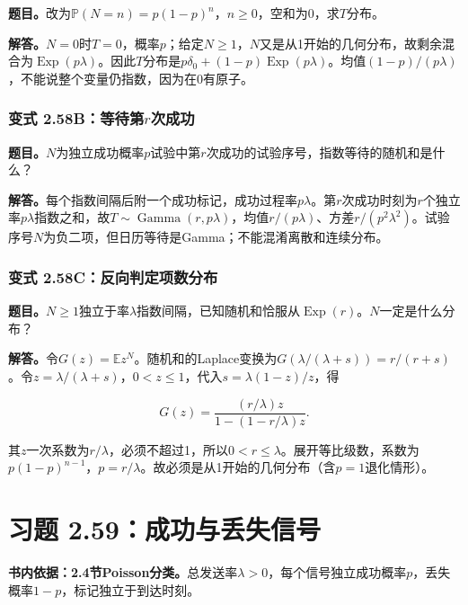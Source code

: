 \documentclass[12pt,a4paper,UTF8,fontset=fandol]{ctexart}
\begin{document}
\textbf{题目。}改为\(\mathbb P(N=n)=p(1-p)^n\)，\(n\ge0\)，空和为0，求\(T\)分布。

\textbf{解答。}\(N=0\)时\(T=0\)，概率\(p\)；给定\(N\ge1\)，\(N\)又是从1开始的几何分布，故剩余混合为\(\operatorname{Exp}(p\lambda)\)。因此\(T\)分布是\(p\delta_0+(1-p)\operatorname{Exp}(p\lambda)\)。均值\((1-p)/(p\lambda)\)，不能说整个变量仍指数，因为在0有原子。

\subsubsection{\texorpdfstring{变式
2.58B：等待第\(r\)次成功}{变式 2.58B：等待第r次成功}}\label{ux53d8ux5f0f-2.58bux7b49ux5f85ux7b2crux6b21ux6210ux529f}

\textbf{题目。}\(N\)为独立成功概率\(p\)试验中第\(r\)次成功的试验序号，指数等待的随机和是什么？

\textbf{解答。}每个指数间隔后附一个成功标记，成功过程率\(p\lambda\)。第\(r\)次成功时刻为\(r\)个独立率\(p\lambda\)指数之和，故\(T\sim\operatorname{Gamma}(r,p\lambda)\)，均值\(r/(p\lambda)\)、方差\(r/(p^2\lambda^2)\)。试验序号\(N\)为负二项，但日历等待是Gamma；不能混淆离散和连续分布。

\subsubsection{变式
2.58C：反向判定项数分布}\label{ux53d8ux5f0f-2.58cux53cdux5411ux5224ux5b9aux9879ux6570ux5206ux5e03}

\textbf{题目。}\(N\ge1\)独立于率\(\lambda\)指数间隔，已知随机和恰服从\(\operatorname{Exp}(r)\)。\(N\)一定是什么分布？

\textbf{解答。}令\(G(z)=\mathbb Ez^N\)。随机和的Laplace变换为\(G(\lambda/(\lambda+s))=r/(r+s)\)。令\(z=\lambda/(\lambda+s)\)，\(0<z\le1\)，代入\(s=\lambda(1-z)/z\)，得

\[G(z)=\frac{(r/\lambda)z}{1-(1-r/\lambda)z}.\]

其\(z\)一次系数为\(r/\lambda\)，必须不超过1，所以\(0<r\le\lambda\)。展开等比级数，系数为\(p(1-p)^{n-1}\)，\(p=r/\lambda\)。故必须是从1开始的几何分布（含\(p=1\)退化情形）。

\section{习题
2.59：成功与丢失信号}\label{ux4e60ux9898-2.59ux6210ux529fux4e0eux4e22ux5931ux4fe1ux53f7}

\textbf{书内依据：2.4节Poisson分类。}总发送率\(\lambda>0\)，每个信号独立成功概率\(p\)，丢失概率\(1-p\)，标记独立于到达时刻。
\end{document}
